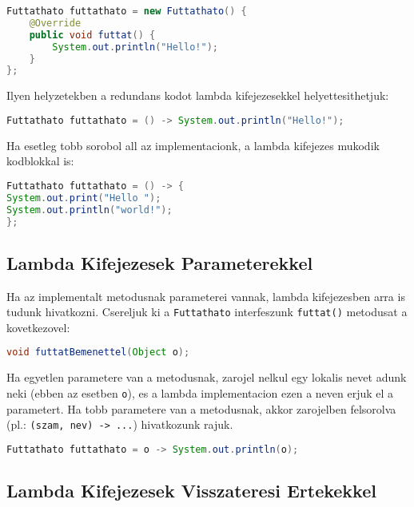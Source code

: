 \documentclass{article}
\let\l\lstinline
\begin{document}
\begin{lstlisting}[language=Java, caption=Futtathato interfesz nevtelen implementacioja]
Futtathato futtathato = new Futtathato() {
    @Override
    public void futtat() {
        System.out.println("Hello!");
    }
};
\end{lstlisting}

Ilyen helyzetekben a redundans kodot lambda kifejezesekkel helyettesithetjuk:

\begin{lstlisting}[language=Java, caption=Egysoros lambda kifejezes]
Futtathato futtathato = () -> System.out.println("Hello!");
\end{lstlisting}

Ha esetleg tobb sorobol all az implementacionk, a lambda kifejezes mukodik kodblokkal is:

\begin{lstlisting}[language=Java, caption=Lambda kifejezes kodblokkal]
Futtathato futtathato = () -> {
System.out.print("Hello ");
System.out.println("world!");
};
\end{lstlisting}

\newpage

\subsection{Lambda Kifejezesek Parameterekkel}

Ha az implementalt metodusnak parameterei vannak, lambda kifejezesben arra is tudunk hivatkozni. Csereljuk ki a \l{Futtathato} interfeszunk \l{futtat()} metodusat a kovetkezovel:

\begin{lstlisting}[language=Java, caption=Absztrakt metodus parameterrel]
void futtatBemenettel(Object o);
\end{lstlisting}

Ha egyetlen parametere van a metodusnak, zarojel nelkul egy lokalis nevet adunk neki (ebben az esetben \l{o}), es a lambda implementacion ezen a neven erjuk el a parametert. Ha tobb parametere van a metodusnak, akkor zarojelben felsorolva (pl.: \l{(szam, nev) -> ...}) hivatkozunk rajuk.

\begin{lstlisting}[language=Java, caption=Parameteres absztrakt metodus implementalasa lambda kifejezessel]
Futtathato futtathato = o -> System.out.println(o);
\end{lstlisting}

\subsection{Lambda Kifejezesek Visszateresi Ertekekkel}
\end{document}
